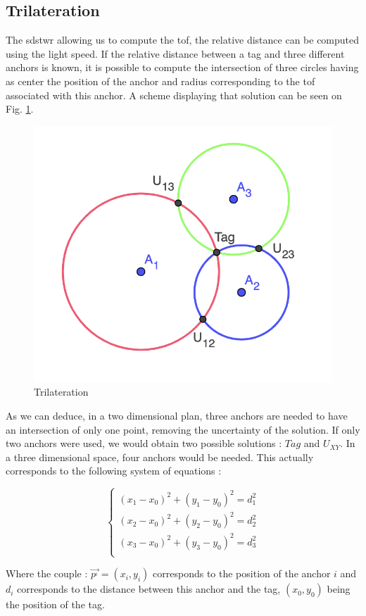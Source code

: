 \subsection{Trilateration}
\label{tril}

The \gls{sdstwr} allowing us to compute the \gls{tof}, the relative distance can be computed using the light speed. If the relative distance between a tag and three different anchors is known, it is possible to compute the intersection of three circles having as center the position of the anchor and radius corresponding to the \gls{tof} associated with this anchor. A scheme displaying that solution can be seen on Fig. \ref{fig:trilateration}.

\begin{figure}[H]
\centering
\includegraphics[width=.5\linewidth]{Images/trilateration.png}
\caption{Trilateration \label{fig:trilateration}}
\end{figure}

As we can deduce, in a two dimensional  plan, three anchors are needed to have an intersection of only one point, removing the uncertainty of the solution. If only two anchors were used, we would obtain two possible solutions : $Tag$ and $U_{XY}$. In a three dimensional space, four anchors would be needed. This actually corresponds to 
the following system of equations :

\begin{equation}
\label{eq:syst_exact}
\begin{cases}
(x_1 - x_0)^2 + (y_1 - y_0)^2 = d_1^2 \\
(x_2 - x_0)^2 + (y_2 - y_0)^2 = d_2^2 \\
(x_3 - x_0)^2 + (y_3 - y_0)^2 = d_3^2 \\
\end{cases}
\end{equation}

Where the couple : $\vec{p^_i} = (x_i, y_i)$ corresponds to the position of the anchor $i$ and $d_i$ corresponds to the distance between this anchor and the tag, $(x_0, y_0)$ being the position of the tag.

